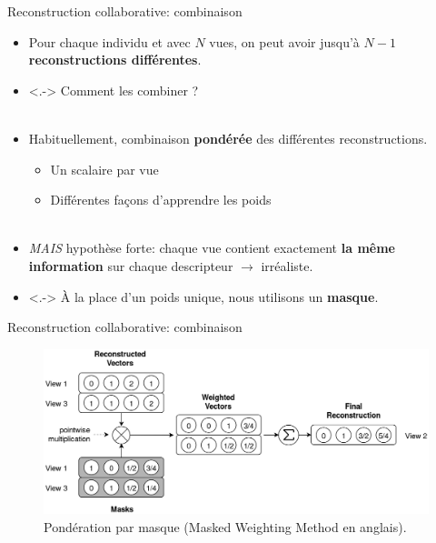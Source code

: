 \documentclass[hyperref={pdfpagelabels=false}]{beamer}
\begin{document}
    \begin{frame}{Reconstruction collaborative: combinaison}
        \begin{itemize}
            \item<+-> Pour chaque individu et avec $N$ vues, on peut avoir 
                jusqu'à $N-1$ \textbf{reconstructions différentes}.
            \item<.-> Comment les combiner ?\\~\\
            \item<+-> Habituellement, combinaison \textbf{pondérée} des 
                différentes reconstructions.
                \begin{itemize}
                    \item Un scalaire par vue
                    \item Différentes façons d'apprendre les poids\\~\\
                \end{itemize}
            \item<+-> \textit{MAIS} hypothèse forte: chaque vue contient 
                exactement \textbf{la même information} sur chaque descripteur 
                $\rightarrow$ irréaliste.
            \item<.-> À la place d'un poids unique, nous utilisons un 
                \textbf{masque}.
        \end{itemize}
    \end{frame}

    \begin{frame}{Reconstruction collaborative: combinaison}
        \begin{figure}[h]
            \centering
            \includegraphics[scale=.2]{mwm.png}
            \caption{Pondération par masque (Masked Weighting Method
                en anglais).
            }
        \end{figure}
    \end{frame}
\end{document}
